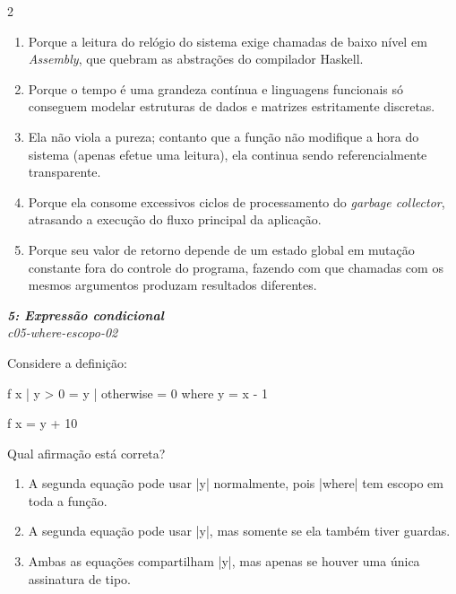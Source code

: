 \documentclass[a4paper,10pt,brazil]{article}
\begin{document}
\begin{multicols}{2}
\begin{enumerate}
  \item Porque a leitura do relógio do sistema exige chamadas de baixo nível em \emph{Assembly}, que quebram as abstrações do compilador Haskell.

  \item Porque o tempo é uma grandeza contínua e linguagens funcionais só conseguem modelar estruturas de dados e matrizes estritamente discretas.

  \item Ela não viola a pureza; contanto que a função não modifique a hora do sistema (apenas efetue uma leitura), ela continua sendo referencialmente transparente.

  \item Porque ela consome excessivos ciclos de processamento do \emph{garbage collector}, atrasando a execução do fluxo principal da aplicação.

  \item Porque seu valor de retorno depende de um estado global em mutação constante fora do controle do programa, fazendo com que chamadas com os mesmos argumentos produzam resultados diferentes.


\end{enumerate}

\begin{flushright}
  \footnotesize
  \textit{\textbf{5: Expressão condicional}}\\
  \textit{c05-where-escopo-02}\\

\end{flushright}
Considere a definição:
\begin{haskellcode}
f x
  | y > 0     = y
  | otherwise = 0
  where y = x - 1

f x = y + 10
\end{haskellcode}
Qual afirmação está correta?

\begin{enumerate}
  \item A segunda equação pode usar \haskellinline|y| normalmente, pois \haskellinline|where| tem escopo em toda a função.

  \item A segunda equação pode usar \haskellinline|y|, mas somente se ela também tiver guardas.

  \item Ambas as equações compartilham \haskellinline|y|, mas apenas se houver uma única assinatura de tipo.


\end{enumerate}
\end{multicols}
\end{document}
